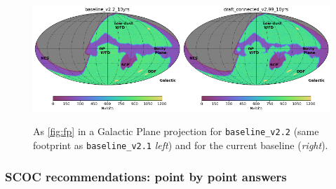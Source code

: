 \begin{figure}
    \centering
    \includegraphics[width=0.5\textwidth]{figures/fp_200_gp.png}\includegraphics[width=0.5\textwidth]{figures/fp_299_gp.png}
    \caption{As \autoref{fig:fp} in a Galactic Plane projection for \texttt{baseline\_v2.2} (same footprint as \texttt{baseline\_v2.1}  \emph{left}) and for the current baseline (\emph{right}).}
    \label{fig:fp2}
\end{figure}

\subsubsection{SCOC recommendations: point by point answers}\label{rec:footprint}

